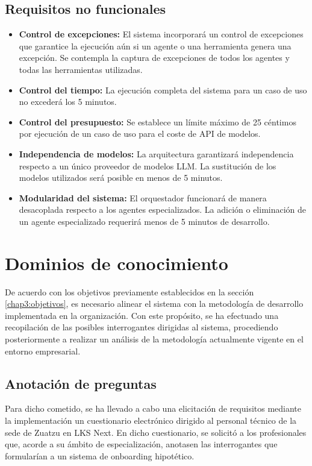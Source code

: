 \subsection{Requisitos no funcionales}
\begin{itemize}
\item\textbf{Control de excepciones: }El sistema incorporará un control de excepciones que garantice la ejecución aún si un agente o una herramienta genera una excepción. Se contempla la captura de excepciones de todos los agentes y todas las herramientas utilizadas.
\item\textbf{Control del tiempo: }La ejecución completa del sistema para un caso de uso no excederá los 5 minutos.
\item\textbf{Control del presupuesto: }Se establece un límite máximo de 25 céntimos por ejecución de un caso de uso para el coste de API de modelos.
\item\textbf{Independencia de modelos: }La arquitectura garantizará independencia respecto a un único proveedor de modelos LLM. La sustitución de los modelos utilizados será posible en menos de 5 minutos.
\item\textbf{Modularidad del sistema: }El orquestador funcionará de manera desacoplada respecto a los agentes especializados. La adición o eliminación de un agente especializado requerirá menos de 5 minutos de desarrollo.
\end{itemize}

\section{Dominios de conocimiento}
De acuerdo con los objetivos previamente establecidos en la sección \ref{chap3:objetivos}, es necesario alinear el sistema con la metodología de desarrollo implementada en la organización. Con este propósito, se ha efectuado una recopilación de las posibles interrogantes dirigidas al sistema, procediendo posteriormente a realizar un análisis de la metodología actualmente vigente en el entorno empresarial.

\subsection{Anotación de preguntas}
Para dicho cometido, se ha llevado a cabo una elicitación de requisitos mediante la implementación un cuestionario electrónico dirigido al personal técnico de la sede de Zuatzu en LKS Next. En dicho cuestionario, se solicitó a los profesionales que, acorde a su ámbito de especialización, anotasen las interrogantes que formularían a un sistema de onboarding hipotético.

